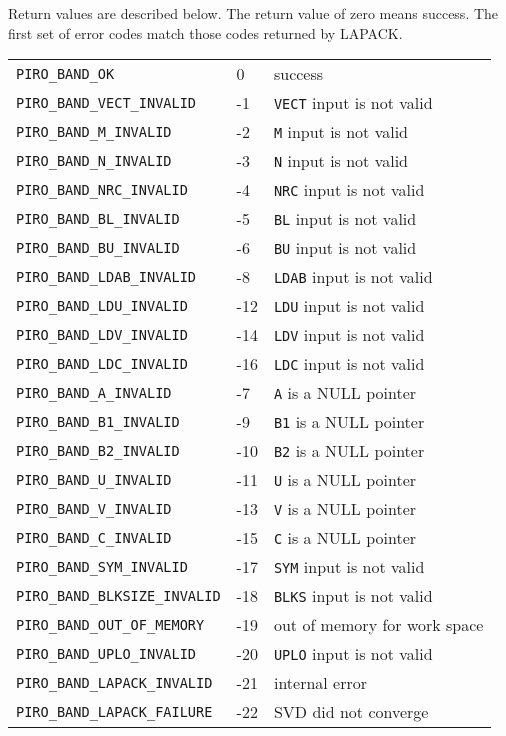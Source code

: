 \documentclass[11pt]{article}
\begin{document}
Return values are described below.  The return value of zero means success.
The first set of error codes match those codes returned by LAPACK.

\vspace{0.1in}
\begin{tabular}{lll}
\hline
{\tt PIRO\_BAND\_OK}               & 0   & success \\
{\tt PIRO\_BAND\_VECT\_INVALID}    & -1  & {\tt VECT} input is not valid \\
{\tt PIRO\_BAND\_M\_INVALID}       & -2  & {\tt M} input is not valid \\
{\tt PIRO\_BAND\_N\_INVALID}       & -3  & {\tt N} input is not valid \\
{\tt PIRO\_BAND\_NRC\_INVALID}     & -4  & {\tt NRC} input is not valid \\
{\tt PIRO\_BAND\_BL\_INVALID}      & -5  & {\tt BL} input is not valid \\
{\tt PIRO\_BAND\_BU\_INVALID}      & -6  & {\tt BU} input is not valid \\
{\tt PIRO\_BAND\_LDAB\_INVALID}    & -8  & {\tt LDAB} input is not valid \\
{\tt PIRO\_BAND\_LDU\_INVALID}     & -12 & {\tt LDU} input is not valid \\
{\tt PIRO\_BAND\_LDV\_INVALID}     & -14 & {\tt LDV} input is not valid \\
{\tt PIRO\_BAND\_LDC\_INVALID}     & -16 & {\tt LDC} input is not valid \\
\hline
{\tt PIRO\_BAND\_A\_INVALID}       & -7  & {\tt A} is a NULL pointer \\
{\tt PIRO\_BAND\_B1\_INVALID}      & -9  & {\tt B1} is a NULL pointer \\
{\tt PIRO\_BAND\_B2\_INVALID}      & -10 & {\tt B2} is a NULL pointer \\
{\tt PIRO\_BAND\_U\_INVALID}       & -11 & {\tt U} is a NULL pointer \\
{\tt PIRO\_BAND\_V\_INVALID}       & -13 & {\tt V} is a NULL pointer \\
{\tt PIRO\_BAND\_C\_INVALID}       & -15 & {\tt C} is a NULL pointer \\
{\tt PIRO\_BAND\_SYM\_INVALID}     & -17 & {\tt SYM} input is not valid \\
{\tt PIRO\_BAND\_BLKSIZE\_INVALID} & -18 & {\tt BLKS} input is not valid \\
%
%
{\tt PIRO\_BAND\_OUT\_OF\_MEMORY}  & -19 & out of memory for work space \\
{\tt PIRO\_BAND\_UPLO\_INVALID}    & -20 & {\tt UPLO} input is not valid \\
%
{\tt PIRO\_BAND\_LAPACK\_INVALID}  & -21 & internal error \\
{\tt PIRO\_BAND\_LAPACK\_FAILURE}  & -22 & SVD did not converge \\
%
\hline
\end{tabular}
\end{document}
